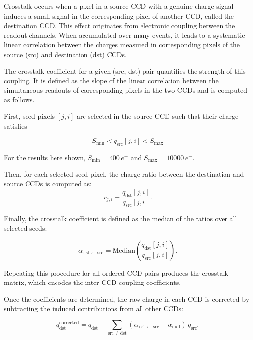 \documentclass[11pt]{article}
\begin{document}
Crosstalk occurs when a pixel in a source CCD with a genuine charge signal induces a small signal in the corresponding pixel of another CCD, called the destination CCD. This effect originates from electronic coupling between the readout channels. When accumulated over many events, it leads to a systematic linear correlation between the charges measured in corresponding pixels of the source (src) and destination (dst) CCDs. 

The crosstalk coefficient for a given (src, dst) pair quantifies the strength of this coupling. It is defined as the slope of the linear correlation between the simultaneous readouts of corresponding pixels in the two CCDs and is computed as follows.

First, seed pixels $[j,i]$ are selected in the source CCD such that their charge satisfies:

\begin{equation}
S_{\min} < q_{\mathrm{src}}[j,i] < S_{\max}
\end{equation}

For the results here shown, $S_{\min} = 400\,e^-$ and $S_{\max} = 10000\,e^-$.

Then, for each selected seed pixel, the charge ratio between the destination and source CCDs is computed as:
\begin{equation}
r_{j,i} =
\frac{q_{\mathrm{dst}}[j,i]}
     {q_{\mathrm{src}}[j,i]} .
\end{equation}

Finally, the crosstalk coefficient is defined as the median of the ratios over all selected seeds:

\begin{equation}
\alpha_{\,\mathrm{dst} \leftarrow \mathrm{src}}
=
\mathrm{Median}
\left(
\frac{q_{\mathrm{dst}}[j,i]}
     {q_{\mathrm{src}}[j,i]}
\right) .
\end{equation}

Repeating this procedure for all ordered CCD pairs produces the crosstalk matrix, which encodes the inter-CCD coupling coefficients.

Once the coefficients are determined, the raw charge in each CCD is corrected by subtracting the induced contributions from all other CCDs:

\begin{equation}
q_{\mathrm{dst}}^{\mathrm{corrected}} = q_{\mathrm{dst}}
-\sum_{\mathrm{src} \neq \mathrm{dst}}
(\alpha_{\,\mathrm{dst} \leftarrow \mathrm{src}} - \alpha_{\mathrm{null}})
\, q_{\mathrm{src}} .
\end{equation}
\end{document}
